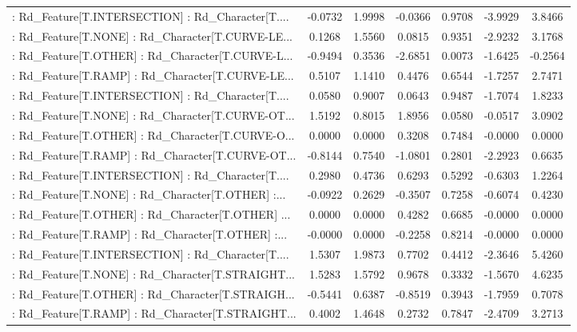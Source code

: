 \begin{longtable}{p{4cm}cccccc}
 : Rd\_Feature[T.INTERSECTION] : Rd\_Character[T.... & -0.0732 &    1.9998 & -0.0366 &       0.9708 & -3.9929 &  3.8466 \\
 : Rd\_Feature[T.NONE] : Rd\_Character[T.CURVE-LE... &  0.1268 &    1.5560 &  0.0815 &       0.9351 & -2.9232 &  3.1768 \\
 : Rd\_Feature[T.OTHER] : Rd\_Character[T.CURVE-L... & -0.9494 &    0.3536 & -2.6851 &       0.0073 & -1.6425 & -0.2564 \\
 : Rd\_Feature[T.RAMP] : Rd\_Character[T.CURVE-LE... &  0.5107 &    1.1410 &  0.4476 &       0.6544 & -1.7257 &  2.7471 \\
 : Rd\_Feature[T.INTERSECTION] : Rd\_Character[T.... &  0.0580 &    0.9007 &  0.0643 &       0.9487 & -1.7074 &  1.8233 \\
 : Rd\_Feature[T.NONE] : Rd\_Character[T.CURVE-OT... &  1.5192 &    0.8015 &  1.8956 &       0.0580 & -0.0517 &  3.0902 \\
 : Rd\_Feature[T.OTHER] : Rd\_Character[T.CURVE-O... &  0.0000 &    0.0000 &  0.3208 &       0.7484 & -0.0000 &  0.0000 \\
 : Rd\_Feature[T.RAMP] : Rd\_Character[T.CURVE-OT... & -0.8144 &    0.7540 & -1.0801 &       0.2801 & -2.2923 &  0.6635 \\
 : Rd\_Feature[T.INTERSECTION] : Rd\_Character[T.... &  0.2980 &    0.4736 &  0.6293 &       0.5292 & -0.6303 &  1.2264 \\
 : Rd\_Feature[T.NONE] : Rd\_Character[T.OTHER] :... & -0.0922 &    0.2629 & -0.3507 &       0.7258 & -0.6074 &  0.4230 \\
 : Rd\_Feature[T.OTHER] : Rd\_Character[T.OTHER] ... &  0.0000 &    0.0000 &  0.4282 &       0.6685 & -0.0000 &  0.0000 \\
 : Rd\_Feature[T.RAMP] : Rd\_Character[T.OTHER] :... & -0.0000 &    0.0000 & -0.2258 &       0.8214 & -0.0000 &  0.0000 \\
 : Rd\_Feature[T.INTERSECTION] : Rd\_Character[T.... &  1.5307 &    1.9873 &  0.7702 &       0.4412 & -2.3646 &  5.4260 \\
 : Rd\_Feature[T.NONE] : Rd\_Character[T.STRAIGHT... &  1.5283 &    1.5792 &  0.9678 &       0.3332 & -1.5670 &  4.6235 \\
 : Rd\_Feature[T.OTHER] : Rd\_Character[T.STRAIGH... & -0.5441 &    0.6387 & -0.8519 &       0.3943 & -1.7959 &  0.7078 \\
 : Rd\_Feature[T.RAMP] : Rd\_Character[T.STRAIGHT... &  0.4002 &    1.4648 &  0.2732 &       0.7847 & -2.4709 &  3.2713 \\

\end{longtable}
